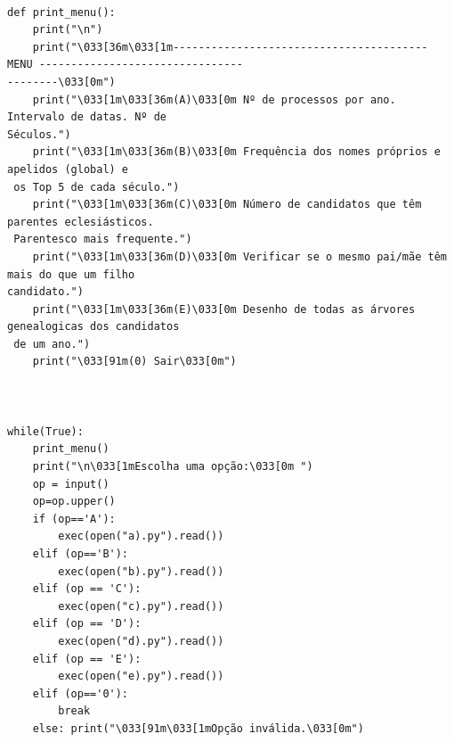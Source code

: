 \documentclass[11pt,a4paper]{report}
\begin{document}
\begin{verbatim}

def print_menu():
    print("\n")
    print("\033[36m\033[1m---------------------------------------- MENU --------------------------------
--------\033[0m")
    print("\033[1m\033[36m(A)\033[0m Nº de processos por ano. Intervalo de datas. Nº de 
Séculos.")
    print("\033[1m\033[36m(B)\033[0m Frequência dos nomes próprios e apelidos (global) e
 os Top 5 de cada século.")
    print("\033[1m\033[36m(C)\033[0m Número de candidatos que têm parentes eclesiásticos.
 Parentesco mais frequente.")
    print("\033[1m\033[36m(D)\033[0m Verificar se o mesmo pai/mãe têm mais do que um filho 
candidato.")
    print("\033[1m\033[36m(E)\033[0m Desenho de todas as árvores genealogicas dos candidatos
 de um ano.")
    print("\033[91m(0) Sair\033[0m")



while(True):
    print_menu()
    print("\n\033[1mEscolha uma opção:\033[0m ")
    op = input()
    op=op.upper()
    if (op=='A'):
        exec(open("a).py").read())
    elif (op=='B'):
        exec(open("b).py").read())
    elif (op == 'C'):
        exec(open("c).py").read())
    elif (op == 'D'):
        exec(open("d).py").read())
    elif (op == 'E'):
        exec(open("e).py").read())
    elif (op=='0'):
        break
    else: print("\033[91m\033[1mOpção inválida.\033[0m")

\end{verbatim}
\end{document}
